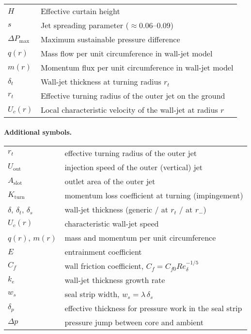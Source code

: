 \documentclass[11pt,a4paper]{article}
\begin{document}
\begin{tabular}{@{}ll@{}}
$H$ & Effective curtain height \\
$s$ & Jet spreading parameter ($\approx0.06$--$0.09$) \\
$\Delta P_{\max}$ & Maximum sustainable pressure difference \\
$q(r)$ & Mass flow per unit circumference in wall-jet model \\
$m(r)$ & Momentum flux per unit circumference in wall-jet model \\
$\delta_t$ & Wall-jet thickness at turning radius $r_t$ \\
$r_t$ & Effective turning radius of the outer jet on the ground \\
$U_c(r)$ & Local characteristic velocity of the wall-jet at radius $r$\\
\bottomrule
\end{tabular}


\paragraph{Additional symbols.}
\begin{tabular}{ll}
\(r_t\) & effective turning radius of the outer jet \\
\(U_{\mathrm{out}}\) & injection speed of the outer (vertical) jet \\
\(A_{\mathrm{slot}}\) & outlet area of the outer jet \\
\(K_{\mathrm{turn}}\) & momentum loss coefficient at turning (impingement) \\
\(\delta\), \(\delta_t\), \(\delta_s\) & wall-jet thickness (generic / at \(r_t\) / at \(r_-\)) \\
\(U_c(r)\) & characteristic wall-jet speed \\
\(q(r)\), \(m(r)\) & mass and momentum per unit circumference \\
\(E\) & entrainment coefficient \\
\(C_f\) & wall friction coefficient, \(C_f=C_{f0} Re_\delta^{-1/5}\) \\
\(k_e\) & wall-jet thickness growth rate \\
\(w_s\) & seal strip width, \(w_s=\lambda\,\delta_s\) \\
\(\delta_p\) & effective thickness for pressure work in the seal strip \\
\(\Delta p\) & pressure jump between core and ambient
\end{tabular}
\end{document}
